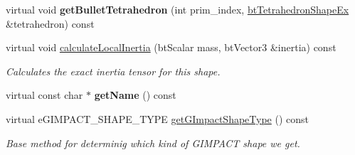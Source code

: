 \begin{DoxyCompactItemize}
\item 
\hypertarget{classbt_g_impact_compound_shape_a64cf7e60512731f3f3c79e04dcc23d54}{virtual void {\bfseries get\+Bullet\+Tetrahedron} (int prim\+\_\+index, \hyperlink{classbt_tetrahedron_shape_ex}{bt\+Tetrahedron\+Shape\+Ex} \&tetrahedron) const }\label{classbt_g_impact_compound_shape_a64cf7e60512731f3f3c79e04dcc23d54}

\item 
\hypertarget{classbt_g_impact_compound_shape_a64f0a70cf342e6bbbcc9721f2a121450}{virtual void \hyperlink{classbt_g_impact_compound_shape_a64f0a70cf342e6bbbcc9721f2a121450}{calculate\+Local\+Inertia} (bt\+Scalar mass, bt\+Vector3 \&inertia) const }\label{classbt_g_impact_compound_shape_a64f0a70cf342e6bbbcc9721f2a121450}

\begin{DoxyCompactList}\small\item\em Calculates the exact inertia tensor for this shape. \end{DoxyCompactList}\item 
\hypertarget{classbt_g_impact_compound_shape_a555b523c182674c59f568558c410d32c}{virtual const char $\ast$ {\bfseries get\+Name} () const }\label{classbt_g_impact_compound_shape_a555b523c182674c59f568558c410d32c}

\item 
virtual e\+G\+I\+M\+P\+A\+C\+T\+\_\+\+S\+H\+A\+P\+E\+\_\+\+T\+Y\+P\+E \hyperlink{classbt_g_impact_compound_shape_a861967c52cb52a358b8d99aa4c65e306}{get\+G\+Impact\+Shape\+Type} () const 
\begin{DoxyCompactList}\small\item\em Base method for determinig which kind of G\+I\+M\+P\+A\+C\+T shape we get. \end{DoxyCompactList}\end{DoxyCompactItemize}
